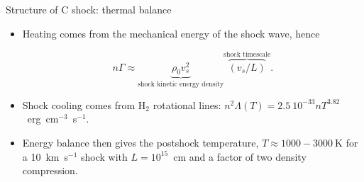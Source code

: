 \begin{frame}{Structure of C shock:
  thermal balance}

\begin{itemize}

\item Heating comes from the mechanical energy of the shock wave,
  hence

\[ n \Gamma \approx  \underbrace{\rho_0 v_s^2}_{\text{shock kinetic energy
  density}} \overbrace{(v_s / L)}^{\text{shock timescale}} . \]

\item Shock cooling comes from H$_2$ rotational lines:
$ n^2 \Lambda(T) = 2.5~10^{-33} n T^{3.82}$~erg~cm$^{-3}$~s$^{-1}$. 

\item Energy balance then gives the postshock temperature, $T \approx
  1000-3000~$K for a 10~km~s$^{-1}$ shock with $L = 10^{15}$~cm and a
  factor of two density compression. 


\end{itemize}

\end{frame}





